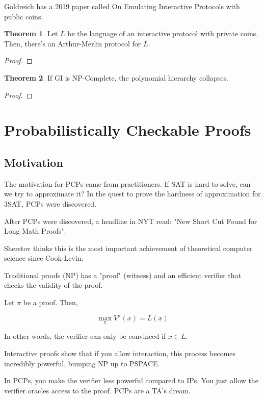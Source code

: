\documentclass{article}
\theoremstyle{definition}
\newtheorem{theorem}{Theorem}[section]
\begin{document}
Goldreich has a 2019 paper called On Emulating Interactive Protocols with public coins.

\begin{theorem}
    Let $L$ be the language of an interactive protocol 
    with private coins. Then, there's an Arthur-Merlin protocol
    for $L$.
\end{theorem}
\begin{proof}
    
\end{proof}

\begin{theorem}
    If GI is NP-Complete, the polynomial hierarchy collapses.
\end{theorem}
\begin{proof}
    
\end{proof}

\newpage

\section{Probabilistically Checkable Proofs}

\subsection{Motivation}

The motivation for PCPs came from practitioners. If SAT is hard to solve, can we try to approximate it?
In the quest to prove the hardness of approximation for 3SAT, PCPs were discovered.

After PCPs were discovered, a headline in NYT read: "New Short Cut Found for 
Long Math Proofs".

Sherstov thinks this is the most important achievement of theoretical computer science
since Cook-Levin.

Traditional proofs (NP) has a "proof" (witness) and an efficient verifier that checks the validity
of the proof.

Let $\pi$ be a proof. Then, 

\[ \max_{\pi} V^{\pi}(x) = L(x) \]

In other words, the verifier can only be convinced if $x \in L$.

Interactive proofs show that if you allow interaction, this process becomes incredibly powerful, bumping
NP up to PSPACE.

In PCPs, you make the verifier less powerful compared to IPs. You just allow the verifier
oracles access to the proof. PCPs are a TA's dream.
\end{document}
